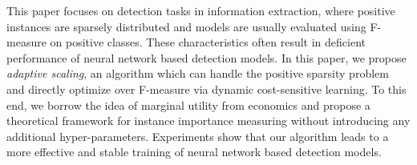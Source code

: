 This paper focuses on detection tasks in information extraction, where positive instances are sparsely distributed and models are usually evaluated using F-measure on positive classes. These characteristics often result in deficient performance of neural network based detection models. In this paper, we propose \emph{adaptive scaling}, an algorithm which can handle the positive sparsity problem and directly optimize over F-measure via dynamic cost-sensitive learning. To this end, we borrow the idea of marginal utility from economics and propose a theoretical framework for instance importance measuring without introducing any additional hyper-parameters. Experiments show that our algorithm leads to a more effective and stable training of neural network based detection models.
